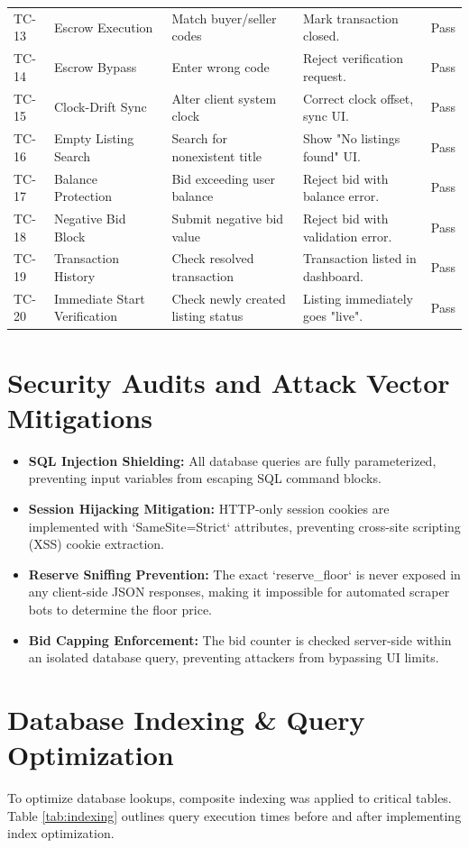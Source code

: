 \documentclass[12pt,a4paper,oneside]{report}
\begin{document}
\begin{table}[H]
\begin{tabular}{lp{3.5cm}p{4cm}p{4cm}c}
TC-13 & Escrow Execution & Match buyer/seller codes & Mark transaction closed. & Pass \\
TC-14 & Escrow Bypass & Enter wrong code & Reject verification request. & Pass \\
TC-15 & Clock-Drift Sync & Alter client system clock & Correct clock offset, sync UI. & Pass \\
TC-16 & Empty Listing Search & Search for nonexistent title & Show "No listings found" UI. & Pass \\
TC-17 & Balance Protection & Bid exceeding user balance & Reject bid with balance error. & Pass \\
TC-18 & Negative Bid Block & Submit negative bid value & Reject bid with validation error. & Pass \\
TC-19 & Transaction History & Check resolved transaction & Transaction listed in dashboard. & Pass \\
TC-20 & Immediate Start Verification & Check newly created listing status & Listing immediately goes "live". & Pass \\
\bottomrule
\end{tabular}
\end{table}

\section{Security Audits and Attack Vector Mitigations}
\begin{itemize}
    \item \textbf{SQL Injection Shielding:} All database queries are fully parameterized, preventing input variables from escaping SQL command blocks.
    \item \textbf{Session Hijacking Mitigation:} HTTP-only session cookies are implemented with `SameSite=Strict` attributes, preventing cross-site scripting (XSS) cookie extraction.
    \item \textbf{Reserve Sniffing Prevention:} The exact `reserve_floor` is never exposed in any client-side JSON responses, making it impossible for automated scraper bots to determine the floor price.
    \item \textbf{Bid Capping Enforcement:} The bid counter is checked server-side within an isolated database query, preventing attackers from bypassing UI limits.
\end{itemize}

\section{Database Indexing & Query Optimization}
To optimize database lookups, composite indexing was applied to critical tables. Table \ref{tab:indexing} outlines query execution times before and after implementing index optimization.
\end{document}
